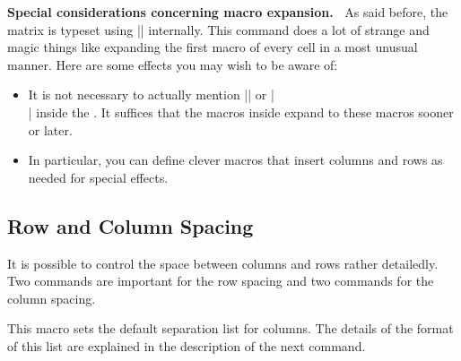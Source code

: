 \begin{command}{\pgfmatrix{}%
    }
  \medskip
  \textbf{Special considerations concerning macro expansion.\ }
  As said before, the matrix is typeset using |\halign|
  internally. This command does a lot of strange and magic things like
  expanding the first macro of every cell in a most unusual
  manner. Here are some effects you may wish to be aware of:
  \begin{itemize}
  \item It is not necessary to actually mention |\pgfmatrixnextcell|
    or |\\| inside the . It suffices that the
    macros inside  expand to these macros sooner or
    later.
  \item In particular, you can define clever macros that insert
    columns and rows as needed for special effects. 
  \end{itemize}
\end{command}


\subsection{Row and Column Spacing}
\label{section-matrix-spacing}

It is possible to control the space between columns and rows rather
detailedly. Two commands are important for the row spacing and two
commands for the column spacing.

\begin{command}{\pgfsetmatrixcolumnsep{}}
  This macro sets the default separation list for columns. The details of the
  format of this list are explained in the description of the next command.
\end{command}

